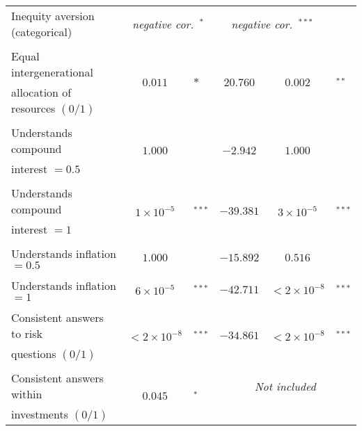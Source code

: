\documentclass[a4paper,12pt]{article}
\begin{document}
{\begin{threeparttable}
\begin{small}
\begin{tabular}{lclccl}
  \vspace{-0.35cm}Inequity aversion (categorical)\tnote{a}&\multicolumn{2}{c}{\textit{negative cor.~}$^{*}$}&\multicolumn{2}{c}{\textit{negative cor.~}$^{***}$}\\
      \\
 Equal intergenerational&\multirow{2}{*}{$0.011$}&\multirow{2}{*}{${*}$}&\multirow{2}{*}{$20.760$}&\multirow{2}{*}{$0.002$}&\multirow{2}{*}{$^{**}$}\\
\vspace{-0.35cm}\hspace{0.6cm}allocation of resources $(0/1)$\tnote{b}&&&\\
 \\  
 Understands compound&\multirow{2}{*}{$1.000$}&\multirow{2}{*}{ }&\multirow{2}{*}{$-2.942$}&\multirow{2}{*}{$1.000$}&\multirow{2}{*}{ }\\
\vspace{-0.35cm}\hspace{0.6cm}interest $=0.5$&&&\\
 \\   
 Understands compound&\multirow{2}{*}{$1\times10^{-5}$}&\multirow{2}{*}{$^{***}$}&\multirow{2}{*}{$-39.381$}&\multirow{2}{*}{$3\times10^{-5}$}&\multirow{2}{*}{$^{***}$}\\
\vspace{-0.35cm}\hspace{0.6cm}interest $=1$&&&\\
  \\  
\vspace{-0.35cm}Understands inflation $=0.5$&$1.000$& &$-15.892$&$0.516$& \\
  \\
\vspace{-0.35cm}Understands inflation $=1$&$6\times10^{-5}$&$^{***}$&$-42.711$&$<2\times10^{-8}$&$^{***}$\\
  \\
 Consistent answers to risk&\multirow{2}{*}{$<2\times10^{-8}$}&\multirow{2}{*}{$^{***}$}&\multirow{2}{*}{$-34.861$}&\multirow{2}{*}{$<2\times10^{-8}$}&\multirow{2}{*}{$^{***}$}\\
 \hspace{0.6cm}  \vspace{-0.35cm} questions $(0/1)$&& &&&\\
\\ Consistent answers within&\multirow{2}{*}{$0.045$}&\multirow{2}{*}{$^{*}$}&\multicolumn{3}{c}{\textit{Not included}}\\
\hspace{0.6cm}investments $(0/1)$\tnote{c}&& &&&

\end{tabular}
\end{small}
\end{threeparttable}}
\end{document}
